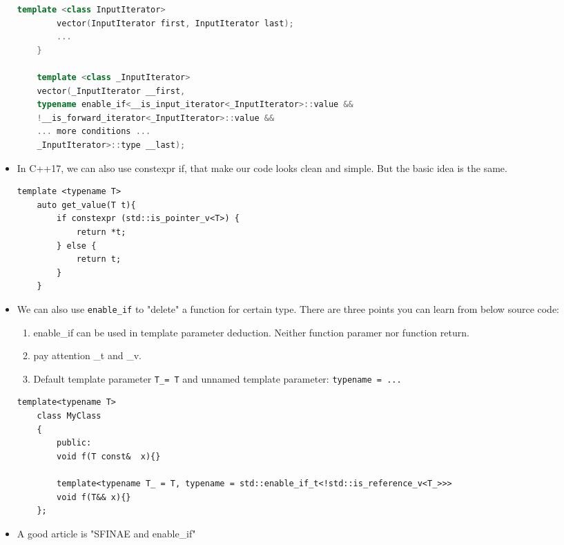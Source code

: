 \documentclass[a4paper,11pt,twoside]{book}
\begin{document}
\begin{itemize}
\begin{lstlisting}[frame=single, language=c++]
		template <class InputIterator>
		vector(InputIterator first, InputIterator last);
		...
	}
	
	template <class _InputIterator>
	vector(_InputIterator __first,
	typename enable_if<__is_input_iterator<_InputIterator>::value &&
	!__is_forward_iterator<_InputIterator>::value &&
	... more conditions ...
	_InputIterator>::type __last);
\end{lstlisting}	
	
	
	

\item In C++17, we can also use constexpr if, that make our code looks clean and simple. But the basic idea is the same. 

\begin{lstlisting}[numbers=none]
	template <typename T>
	auto get_value(T t){
		if constexpr (std::is_pointer_v<T>) {
			return *t;
		} else {
			return t;
		}
	}
\end{lstlisting}

		\item We can also use \texttt{enable\_if} to "delete" a function for certain type. There are three points you can learn from below source code:
		\begin{enumerate}
			\item enable\_if can be used in template parameter deduction. Neither function paramer nor function return.
			\item pay attention \_t and \_v.
			\item Default template parameter \texttt{T\_= T} and unnamed template parameter: \texttt{typename = ...}
		\end{enumerate}
\begin{lstlisting}[numbers=none]
	template<typename T>
	class MyClass
	{
		public:
		void f(T const&  x){}
		
		template<typename T_ = T, typename = std::enable_if_t<!std::is_reference_v<T_>>>
		void f(T&& x){}
	};
\end{lstlisting}		
		
	
	\item A good article is "SFINAE and enable\_if"
\end{itemize}
\end{document}
